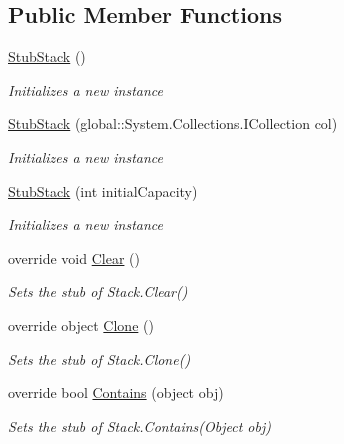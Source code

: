 \subsection*{Public Member Functions}
\begin{DoxyCompactItemize}
\item 
\hyperlink{class_system_1_1_collections_1_1_fakes_1_1_stub_stack_ae2bef1ba5a45dfcbb774072f78c771af}{Stub\-Stack} ()
\begin{DoxyCompactList}\small\item\em Initializes a new instance\end{DoxyCompactList}\item 
\hyperlink{class_system_1_1_collections_1_1_fakes_1_1_stub_stack_a6a5d8b1fd76007c67c40eb4c91c7945d}{Stub\-Stack} (global\-::\-System.\-Collections.\-I\-Collection col)
\begin{DoxyCompactList}\small\item\em Initializes a new instance\end{DoxyCompactList}\item 
\hyperlink{class_system_1_1_collections_1_1_fakes_1_1_stub_stack_af32545a8014fc9b596b101b6fa00373b}{Stub\-Stack} (int initial\-Capacity)
\begin{DoxyCompactList}\small\item\em Initializes a new instance\end{DoxyCompactList}\item 
override void \hyperlink{class_system_1_1_collections_1_1_fakes_1_1_stub_stack_ac178775227756b57a49d65c03772f8cf}{Clear} ()
\begin{DoxyCompactList}\small\item\em Sets the stub of Stack.\-Clear()\end{DoxyCompactList}\item 
override object \hyperlink{class_system_1_1_collections_1_1_fakes_1_1_stub_stack_aa5d82dac80df45fe27171e215ed07930}{Clone} ()
\begin{DoxyCompactList}\small\item\em Sets the stub of Stack.\-Clone()\end{DoxyCompactList}\item 
override bool \hyperlink{class_system_1_1_collections_1_1_fakes_1_1_stub_stack_ae78467f7fba8a87ce22b751a576c71c2}{Contains} (object obj)
\begin{DoxyCompactList}\small\item\em Sets the stub of Stack.\-Contains(\-Object obj)\end{DoxyCompactList}\item 

\end{DoxyCompactItemize}
